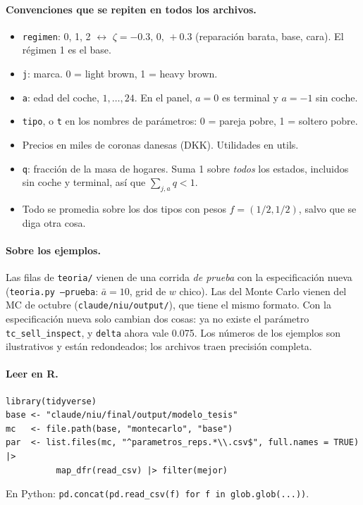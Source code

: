 \documentclass[11pt]{article}
\newcommand{\col}[1]{\texttt{#1}}
\begin{document}
\paragraph{Convenciones que se repiten en todos los archivos.}
\begin{itemize}
  \item \col{regimen}: 0, 1, 2 $\leftrightarrow$ $\zeta=-0.3,\,0,\,+0.3$ (reparación barata,
  base, cara). El régimen 1 es el base.
  \item \col{j}: marca. 0 = light brown, 1 = heavy brown.
  \item \col{a}: edad del coche, $1,\dots,24$. En el panel, $a=0$ es terminal y $a=-1$ sin coche.
  \item \col{tipo}, o \col{t} en los nombres de parámetros: 0 = pareja pobre, 1 = soltero pobre.
  \item Precios en miles de coronas danesas (DKK). Utilidades en utils.
  \item \col{q}: fracción de la masa de hogares. Suma 1 sobre \emph{todos} los estados,
  incluidos sin coche y terminal, así que $\sum_{j,a}q<1$.
  \item Todo se promedia sobre los dos tipos con pesos $f=(1/2,1/2)$, salvo que se diga otra cosa.
\end{itemize}

\paragraph{Sobre los ejemplos.} Las filas de \texttt{teoria/} vienen de una corrida
\emph{de prueba} con la especificación nueva (\texttt{teoria.py --prueba}: $\bar a=10$, grid
de $w$ chico). Las del Monte Carlo vienen del MC de octubre (\texttt{claude/niu/output/}), que
tiene el mismo formato. Con la especificación nueva solo cambian dos cosas: ya no existe el
parámetro \col{tc\_sell\_inspect}, y \col{delta} ahora vale 0.075. Los números de los
ejemplos son ilustrativos y están redondeados; los archivos traen precisión completa.

\paragraph{Leer en R.}
\begin{Verbatim}
library(tidyverse)
base <- "claude/niu/final/output/modelo_tesis"
mc   <- file.path(base, "montecarlo", "base")
par  <- list.files(mc, "^parametros_reps.*\\.csv$", full.names = TRUE) |>
          map_dfr(read_csv) |> filter(mejor)
\end{Verbatim}
En Python: \texttt{pd.concat(pd.read\_csv(f) for f in glob.glob(...))}.
\end{document}
